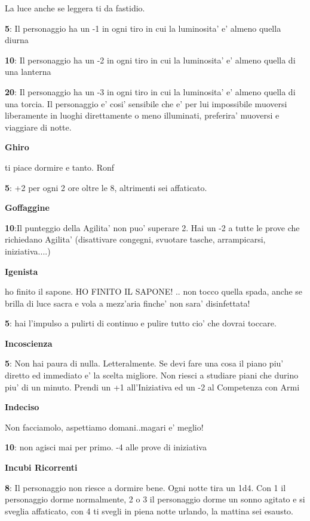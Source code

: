 \documentclass[a4paper,11pt,twoside,openany]{book}
\begin{document}
{		La luce anche se leggera ti da fastidio.
		
		\textbf{5}: Il personaggio ha un -1 in ogni tiro in cui la luminosita' e' almeno quella diurna
		
		\textbf{10}: Il personaggio ha un -2 in ogni tiro in cui la luminosita' e' almeno quella di una lanterna
		
		\textbf{20}: Il personaggio ha un -3 in ogni tiro in cui la luminosita' e' almeno quella di una torcia. Il personaggio e' cosi' sensibile che e' per lui impossibile muoversi liberamente in luoghi direttamente o meno illuminati, preferira' muoversi e viaggiare di notte.
		
		\textbf{Ghiro}
		
		ti piace dormire e tanto. Ronf
		
		\textbf{5}: +2 per ogni 2 ore oltre le 8, altrimenti sei affaticato.
		
		\textbf{Goffaggine}
		
		\textbf{10}:Il punteggio della Agilita' non puo' superare 2. Hai un -2 a tutte le prove che richiedano Agilita' (disattivare congegni, svuotare tasche, arrampicarsi, iniziativa....) 
		
		\textbf{Igenista}
		
		ho finito il sapone. HO FINITO IL SAPONE! .. non tocco quella spada, anche se brilla di luce sacra e vola a mezz'aria finche' non sara' disinfettata!
		
		\textbf{5}: hai l'impulso a pulirti di continuo e pulire tutto cio' che dovrai toccare.
		
		\textbf{Incoscienza}
		
		\textbf{5}: Non hai paura di nulla. Letteralmente. Se devi fare una cosa il piano piu' diretto ed immediato e' la scelta migliore. Non riesci a studiare piani che durino piu' di un minuto. Prendi un +1 all'Iniziativa ed un -2 al Competenza con Armi
		
		\textbf{Indeciso}
		
		Non facciamolo, aspettiamo domani..magari e' meglio!
		
		\textbf{10}: non agisci mai per primo. -4 alle prove di iniziativa
		
		\textbf{Incubi Ricorrenti}
		
		\textbf{8}: Il personaggio non riesce a dormire bene. Ogni notte tira un 1d4. Con 1 il personaggio dorme normalmente, 2 o 3 il personaggio dorme un sonno agitato e si sveglia affaticato, con 4 ti svegli in piena notte urlando, la mattina sei esausto.
		
}
\end{document}
